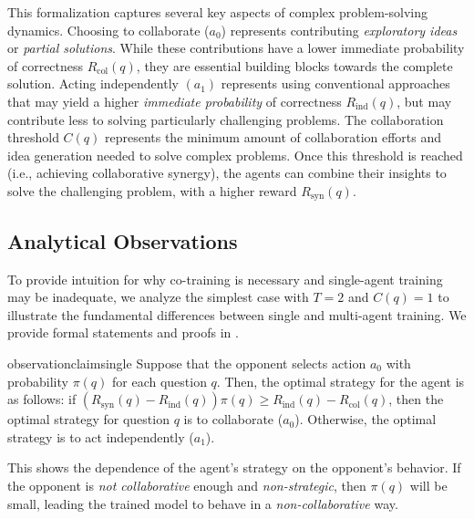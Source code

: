 \begin{remark}
\label{rmk:rationale}
\upshape
This formalization captures several key aspects of complex problem-solving dynamics. Choosing to collaborate ($a_0$) represents contributing \textit{exploratory ideas} or \textit{partial solutions}. While these contributions have a lower immediate probability of correctness \(R_{\text{col}}(q)\), they are essential building blocks towards the complete solution. Acting independently $(a_1)$ represents using conventional approaches that may yield a higher \textit{immediate probability} of correctness \(R_{\text{ind}}(q)\), but may contribute less to solving particularly challenging problems. The collaboration threshold \(C(q)\) represents the minimum amount of collaboration efforts and idea generation needed to solve complex problems. Once this threshold is reached (i.e., achieving collaborative synergy), the agents can combine their insights to solve the challenging problem, with a higher  reward \(R_{\text{syn}}(q)\).
\end{remark}

\safevspace{-3mm}

\subsection{Analytical Observations}
To provide intuition for why co-training is necessary and single-agent training may be inadequate, 
we analyze the simplest case with $T=2$ and $C(q) = 1$ to illustrate the fundamental differences between single and multi-agent training. We provide formal statements and proofs in .

 
\safevspace{-3mm}

\begin{restatable}{observation}{claimsingle}
\label{claim:1}
Suppose that the opponent selects action \( a_0 \) with probability \( \pi(q) \) for each question \( q \). Then, the optimal strategy for the agent is as follows: if  $(R_{\text{syn}}(q) - R_{\text{ind}}(q))\pi(q) \geq R_{\text{ind}}(q) - R_{\text{col}}(q)$, then the optimal strategy for question \( q \) is to collaborate (\( a_0 \)). Otherwise, the optimal strategy is to act independently (\( a_1 \)).
\end{restatable}

\safevspace{-2mm}

This shows the dependence of the agent's strategy on the opponent's behavior. If the opponent is {\it not collaborative} enough  and {\it non-strategic}, then \( \pi(q) \) will be small, leading the trained model to behave in a  \textit{non-collaborative} way. 

